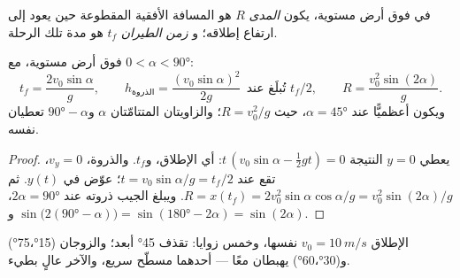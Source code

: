 \begin{definition}[المدى]\label{def:g12:projectile-motion:range}
في  فوق أرض مستوية، يكون \emph{المدى} $R$ هو
المسافة الأفقية المقطوعة حين يعود إلى ارتفاع إطلاقه؛ و
\emph{زمن الطيران} $t_f$ هو مدة تلك الرحلة.
\end{definition}

\begin{proposition}\label{prop:g12:projectile-motion:range}
فوق أرض مستوية، مع $0 < \alpha < \ang{90}$:
\[
t_f = \frac{2 v_0 \sin\alpha}{g}, \qquad
h_{\text{الذروة}} = \frac{(v_0\sin\alpha)^2}{2g}
\ \ \text{تُبلَغ عند } t_f/2, \qquad
R = \frac{v_0^2 \sin(2\alpha)}{g}.
\]
ويكون  أعظميًّا عند $\alpha = \ang{45}$، حيث $R = v_0^2/g$؛
والزاويتان المتتامّتان $\alpha$ و$\ang{90} - \alpha$ تعطيان  نفسه.
\end{proposition}

\begin{proof}
يعطي $y = 0$ النتيجة $t\,(v_0\sin\alpha - \tfrac12 gt) = 0$: أي الإطلاق، و$t_f$.
والذروة، $v_y = 0$، تقع عند $t = v_0\sin\alpha/g = t_f/2$؛ عوّض في
$y(t)$. ثم $R = x(t_f) = 2v_0^2\sin\alpha\cos\alpha/g =
v_0^2\sin(2\alpha)/g$. ويبلغ الجيب ذروته عند $2\alpha = \ang{90}$، و
$\sin\bigl(2(\ang{90}-\alpha)\bigr) = \sin(\ang{180} - 2\alpha) =
\sin(2\alpha)$.
\end{proof}

\begin{omfigure}

{\small {} الإطلاق $v_0 = \qty{10}{m/s}$ نفسها، وخمس زوايا: تقذف \ang{45}
أبعد؛ والزوجان (\ang{15}،\ang{75}) و(\ang{30}،\ang{60})
يهبطان معًا --- أحدهما مسطّح سريع، والآخر عالٍ بطيء.}
\end{omfigure}


